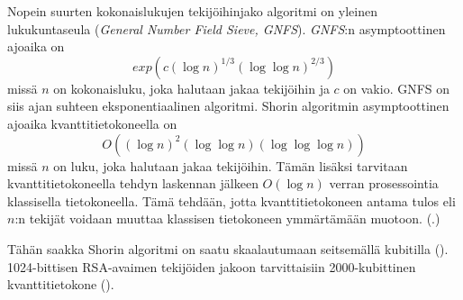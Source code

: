 Nopein suurten kokonaislukujen tekijöihinjako algoritmi on yleinen lukukuntaseula (\emph{General Number Field Sieve, GNFS}). \emph{GNFS}:n asymptoottinen ajoaika on \[exp(c(\log n)^{1/3} (\log \log n)^{2/3})\] missä $n$ on kokonaisluku, joka halutaan jakaa tekijöihin ja $c$ on vakio. GNFS on siis ajan suhteen eksponentiaalinen algoritmi. Shorin algoritmin asymptoottinen ajoaika kvanttitietokoneella on \[O((\log n)^{2}(\log \log n) (\log \log \log n))\] missä $n$ on luku, joka halutaan jakaa tekijöihin. Tämän lisäksi tarvitaan kvanttitietokoneella tehdyn laskennan jälkeen $O(\log n)$ verran prosessointia klassisella tietokoneella. Tämä tehdään, jotta kvanttitietokoneen antama tulos eli $n$:n tekijät voidaan muuttaa klassisen tietokoneen ymmärtämään muotoon. (\cite{doi:10.1137/S0036144598347011}.)

Tähän saakka Shorin algoritmi on saatu skaalautumaan seitsemällä kubitilla (\cite{doi:10.1126/science.aad9480}). 1024-bittisen RSA-avaimen tekijöiden jakoon tarvittaisiin 2000-kubittinen kvanttitietokone (\cite{mavroeidis2018impact}).
